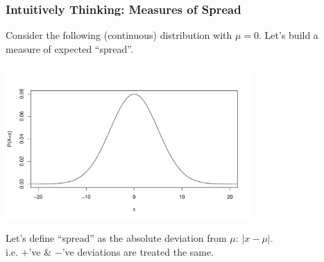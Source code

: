 \documentclass[handout]{beamer}
\newcommand{\blue}[1]{\textcolor{blue2}{#1}}
\begin{document}
%
%
%
%
\begin{frame}
\frametitle{Intuitively Thinking:  Measures of Spread}
Consider the following (continuous) distribution with $\mu=0$.  Let's build a measure of \blue{expected ``spread''}. 
\begin{center}
\includegraphics[width=0.7\textwidth]{figure/spread1}
\end{center}
\pause Let's define ``spread'' as the \blue{absolute deviation from $\mu$}: $|x - \mu|$.\\
i.e. $+$'ve \& $-$'ve deviations are treated the same.
\end{frame}
\end{document}
